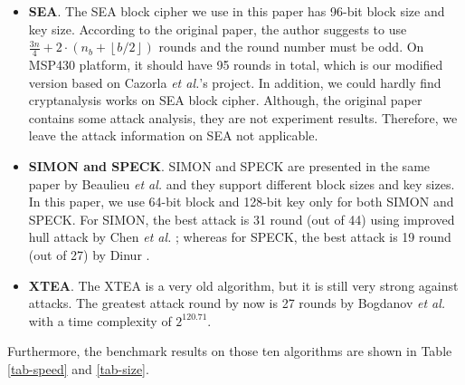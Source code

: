 \documentclass[sigconf, review=false]{acmart}
\begin{document}
\begin{itemize}
    \item
\textbf{SEA}. The SEA \cite{standaert2006sea} block cipher we use in this paper has 96-bit block size and key size.
According to the original paper, the author suggests to use $\frac{3n}{4}+2\cdot (n_{b}+\left \lfloor b/2 \right \rfloor)$ rounds and the round number must be odd.
On MSP430 platform, it should have 95 rounds in total, which is our modified version based on Cazorla \textit{et al.}'s project.
In addition, we could hardly find cryptanalysis works on SEA block cipher.
Although, the original paper contains some attack analysis, they are not experiment results. Therefore, we leave the attack information on SEA not applicable.

    \item
\textbf{SIMON and SPECK}. SIMON and SPECK are presented in the same paper by Beaulieu \textit{et al.} \cite{beaulieu2015simon}
and they support different block sizes and key sizes. In this paper, we use 64-bit block and 128-bit key only for both SIMON and SPECK.
For SIMON, the best attack is 31 round (out of 44) using improved hull attack by Chen \textit{et al.} \cite{chen2016improved};
whereas for SPECK, the best attack is 19 round (out of 27) by Dinur \cite{dinur2014improved}.

    \item
\textbf{XTEA}. The XTEA \cite{wheeler1998correction} is a very old algorithm, but it is still very strong against attacks.
The greatest attack round by now is 27 rounds by Bogdanov \textit{et al.} \cite{bogdanov2012zero} with a time complexity of $2^{120.71}$.
\end{itemize}

Furthermore, the benchmark results on those ten algorithms are shown in Table \ref{tab-speed} and \ref{tab-size}.
\end{document}
